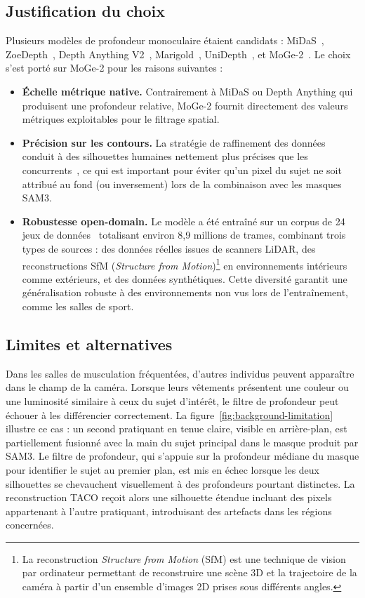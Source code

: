 \subsection{Justification du choix}

Plusieurs modèles de profondeur monoculaire étaient candidats : MiDaS~\cite{MiDaS-2020}, ZoeDepth~\cite{ZoeDepth-2023}, Depth Anything V2~\cite{Depth-Anything-V2-2024}, Marigold~\cite{Marigold-2024}, UniDepth~\cite{UniDepth-2024}, et MoGe-2~\cite{MoGe2-2025}. Le choix s'est porté sur MoGe-2 pour les raisons suivantes :

\begin{itemize}
  \item \textbf{Échelle métrique native.} Contrairement à MiDaS ou Depth Anything qui produisent une profondeur relative, MoGe-2 fournit directement des valeurs métriques exploitables pour le filtrage spatial.
  \item \textbf{Précision sur les contours.} La stratégie de raffinement des données conduit à des silhouettes humaines nettement plus précises que les concurrents~\cite{MoGe2-2025}, ce qui est important pour éviter qu'un pixel du sujet ne soit attribué au fond (ou inversement) lors de la combinaison avec les masques SAM3.
  \item \textbf{Robustesse open-domain.} Le modèle a été entraîné sur un corpus de 24 jeux de données~\cite{MoGe2-2025} totalisant environ 8,9 millions de trames, combinant trois types de sources : des données réelles issues de scanners LiDAR, des reconstructions SfM (\textit{Structure from Motion})\footnote{La reconstruction \emph{Structure from Motion} (SfM) est une technique de vision par ordinateur permettant de reconstruire une scène 3D et la trajectoire de la caméra à partir d'un ensemble d'images 2D prises sous différents angles.} en environnements intérieurs comme extérieurs, et des données synthétiques. Cette diversité garantit une généralisation robuste à des environnements non vus lors de l'entraînement, comme les salles de sport.
\end{itemize}

\subsection{Limites et alternatives} \label{subsec:background-limitation}

Dans les salles de musculation fréquentées, d'autres individus peuvent apparaître dans le champ de la caméra. Lorsque leurs vêtements présentent une couleur ou une luminosité similaire à ceux du sujet d'intérêt, le filtre de profondeur peut échouer à les différencier correctement. La figure~\ref{fig:background-limitation} illustre ce cas : un second pratiquant en tenue claire, visible en arrière-plan, est partiellement fusionné avec la main du sujet principal dans le masque produit par SAM3. Le filtre de profondeur, qui s'appuie sur la profondeur médiane du masque pour identifier le sujet au premier plan, est mis en échec lorsque les deux silhouettes se chevauchent visuellement à des profondeurs pourtant distinctes. La reconstruction TACO reçoit alors une silhouette étendue incluant des pixels appartenant à l'autre pratiquant, introduisant des artefacts dans les régions concernées.

